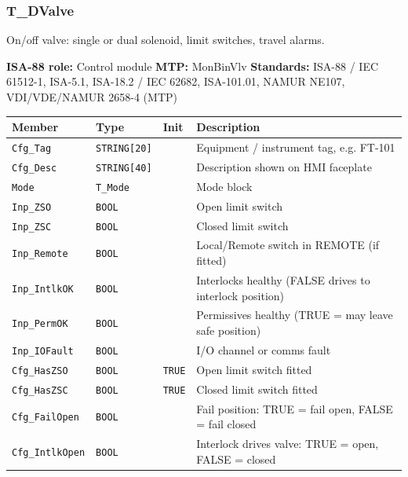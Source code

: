 \subsubsection*{T\_DValve}
\label{app:pclib:tdvalve}
On/\allowbreak{}off valve: single or dual solenoid, limit switches, travel alarms.

{\small\textbf{ISA-88 role:} Control module \quad \textbf{MTP:} MonBinVlv \quad \textbf{Standards:} ISA-88 /\allowbreak{} IEC 61512-1, ISA-5.1, ISA-18.2 /\allowbreak{} IEC 62682, ISA-101.01, NAMUR NE107, VDI/\allowbreak{}VDE/\allowbreak{}NAMUR 2658-4 (MTP)}
{\footnotesize
\begin{longtable}{@{}>{\raggedright\arraybackslash}p{3.4cm}>{\raggedright\arraybackslash}p{3.3cm}>{\raggedright\arraybackslash}p{1.3cm}>{\raggedright\arraybackslash}p{6.4cm}@{}}
\toprule
\rowcolor{tblhead}\textbf{Member} & \textbf{Type} & \textbf{Init} & \textbf{Description} \\
\midrule
\endhead
\texttt{Cfg\_Tag} & \texttt{STRING[20]} &  & Equipment /\allowbreak{} instrument tag, e.g. FT-101 \\
\texttt{Cfg\_Desc} & \texttt{STRING[40]} &  & Description shown on HMI faceplate \\
\texttt{Mode} & \texttt{T\_Mode} &  & Mode block \\
\texttt{Inp\_ZSO} & \texttt{BOOL} &  & Open limit switch \\
\texttt{Inp\_ZSC} & \texttt{BOOL} &  & Closed limit switch \\
\texttt{Inp\_Remote} & \texttt{BOOL} &  & Local/\allowbreak{}Remote switch in REMOTE (if fitted) \\
\texttt{Inp\_IntlkOK} & \texttt{BOOL} &  & Interlocks healthy (FALSE drives to interlock position) \\
\texttt{Inp\_PermOK} & \texttt{BOOL} &  & Permissives healthy (TRUE = may leave safe position) \\
\texttt{Inp\_IOFault} & \texttt{BOOL} &  & I/\allowbreak{}O channel or comms fault \\
\texttt{Cfg\_HasZSO} & \texttt{BOOL} & \texttt{TRUE} & Open limit switch fitted \\
\texttt{Cfg\_HasZSC} & \texttt{BOOL} & \texttt{TRUE} & Closed limit switch fitted \\
\texttt{Cfg\_FailOpen} & \texttt{BOOL} &  & Fail position: TRUE = fail open, FALSE = fail closed \\
\texttt{Cfg\_IntlkOpen} & \texttt{BOOL} &  & Interlock drives valve: TRUE = open, FALSE = closed \\

\end{longtable}}
